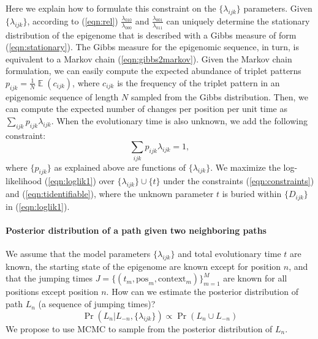 \documentclass[11pt]{article}
\DeclareMathOperator{\E}{\mathbb{E}}
\begin{document}
Here we explain how to formulate this constraint on the
$\{\lambda_{ijk}\}$ parameters. Given $\{\lambda_{ijk}\}$, according
to (\ref{eqn:rel}) $\frac{\lambda_{010}}{\lambda_{000}}$ and
$\frac{\lambda_{001}}{\lambda_{011}}$ can uniquely determine the
stationary distribution of the epigenome that is described with a
Gibbs measure of form (\ref{eqn:stationary}).  The Gibbs measure for
the epigenomic sequence, in turn, is equivalent to a Markov chain
(\ref{eqn:gibbs2markov}). Given the Markov chain formulation, we can
easily compute the expected abundance of triplet patterns $p_{ijk} =
\frac{1}{N}\E(c_{ijk})$, where $c_{ijk}$ is the frequency of the
triplet pattern in an epigenomic sequence of length $N$ sampled from
the Gibbs distribution. Then, we can compute the expected number of
changes per position per unit time as
$\sum_{ijk}p_{ijk}\lambda_{ijk}$. When the evolutionary time is also 
unknown, we add the following constraint:
\begin{equation}\label{eqn:tidentifiable}
\sum_{ijk}p_{ijk}\lambda_{ijk} = 1, 
\end{equation}
where $\{p_{ijk}\}$ as explained above are functions of
$\{\lambda_{ijk}\}$.  We maximize the log-likelihood
(\ref{eqn:loglik1}) over $\{\lambda_{ijk}\}\cup\{t\}$ under the
constraints (\ref{eqn:constraints}) and (\ref{eqn:tidentifiable}),
where the unknown parameter $t$ is buried within $\{D_{ijk}\}$ in
(\ref{eqn:loglik1}).


\paragraph{Posterior distribution of a path given two neighboring paths} We
assume that the model parameters $\{\lambda_{ijk}\}$ and total
evolutionary time $t$ are known, the starting state of the epigenome
are known except for position $n$, and that the jumping times $J =
\{(t_m, \text{pos}_m, \text{context}_m) \}_{m=1}^{M}$ are known for
all positions except position $n$. How can we estimate the posterior
distribution of path $L_{n}$ (a sequence of jumping times)?
\[
\Pr(L_n|L_{-n}, \{\lambda_{ijk}\}) \propto \Pr(L_n\cup L_{-n})
\]
We propose to use MCMC to sample from the posterior
distribution of $L_n$. 
\end{document}
